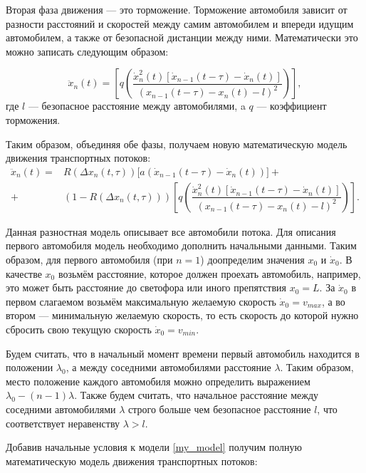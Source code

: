 \documentclass[12pt, a4paper]{extarticle}
\numberwithin{equation}{section}
\numberwithin{figure}{section}
\begin{document}
Вторая фаза движения --- это торможение. Торможение автомобиля зависит от разности расстояний и скоростей между самим автомобилем и впереди идущим автомобилем, а также от безопасной дистанции между ними. Математически это можно записать следующим образом: 

\begin{equation*}
\ddot{x}_n(t)= \left[  q\left(  \dfrac{\dot{x}_n^2(t)\left[  \dot{x}_{n-1}(t-\tau) - \dot{x}_n(t) \right]}{(x_{n-1}(t-\tau)-x_n(t)-l)^2}\right) \right],
\end{equation*}
где $l$ --- безопасное расстояние между автомобилями, a $q$ --- коэффициент торможения.

Таким образом, объединяя обе фазы, получаем новую математическую модель движения транспортных потоков:
\begin{equation} \label{my_model} 
\begin{split}
\ddot{x}_n(t)= &R(\Delta x_n(t,\tau))\bigg[ a(\dot{x}_{n-1}(t-\tau)-\dot{x}_n(t))\bigg]  +\\+& (1-R(\Delta x_n(t,\tau)))\left[  q\left(  \dfrac{\dot{x}_n^2(t)\left[  \dot{x}_{n-1}(t-\tau) - \dot{x}_n(t) \right]}{(x_{n-1}(t-\tau)-x_n(t)-l)^2}\right) \right]. 
\end{split}
\end{equation}

Данная разностная модель описывает все автомобили потока. Для описания первого автомобиля модель необходимо дополнить начальными данными. Таким образом, для первого автомобиля (при $n=1$) доопределим значения $x_{0}$ и $\dot{x}_{0}$. В качестве $x_{0}$ возьмём расстояние, которое должен проехать автомобиль, например, это может быть расстояние до светофора или иного препятствия $x_{0}=L$. За $\dot{x}_{0}$ в первом слагаемом возьмём максимальную желаемую скорость $\dot{x}_{0}=v_{max}$, а во втором --- минимальную желаемую скорость, то есть скорость до которой нужно сбросить свою текущую скорость $\dot{x}_{0}=v_{min}$.

Будем считать, что в начальный момент времени первый автомобиль находится в положении $\lambda_0$, а между соседними автомобилями расстояние $\lambda$. Таким образом, место положение каждого автомобиля можно определить выражением $\lambda_0-(n-1)\lambda$. Также будем считать, что начальное расстояние между соседними автомобилями $\lambda$ строго больше чем безопасное расстояние $l$, что соответствует неравенству $\lambda > l$.

Добавив начальные условия к модели \eqref{my_model} получим полную математическую модель движения транспортных потоков:
\end{document}
